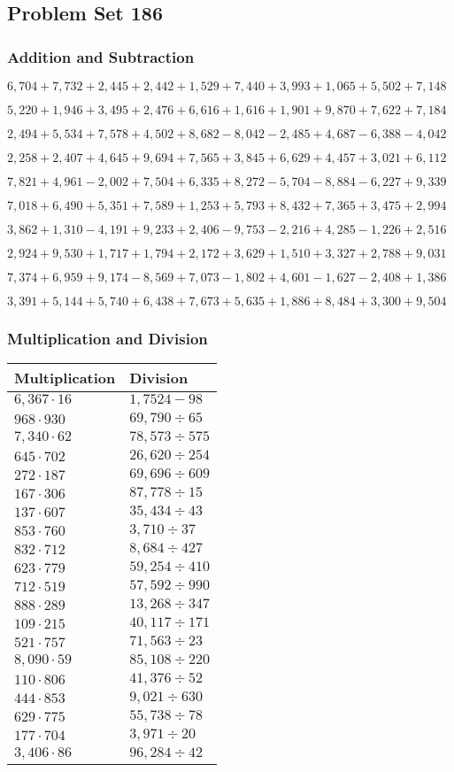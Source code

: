 \hypertarget{problem-set-186}{%
\subsection{Problem Set 186}\label{problem-set-186}}

\hypertarget{addition-and-subtraction}{%
\subsubsection{Addition and
Subtraction}\label{addition-and-subtraction}}

\(6,704+7,732+2,445+2,442+1,529+7,440+3,993+1,065+5,502+7,148\)

\(5,220+1,946+3,495+2,476+6,616+1,616+1,901+9,870+7,622+7,184\)

\(2,494+5,534+7,578+4,502+8,682-8,042-2,485+4,687-6,388-4,042\)

\(2,258+2,407+4,645+9,694+7,565+3,845+6,629+4,457+3,021+6,112\)

\(7,821+4,961-2,002+7,504+6,335+8,272-5,704-8,884-6,227+9,339\)

\(7,018+6,490+5,351+7,589+1,253+5,793+8,432+7,365+3,475+2,994\)

\(3,862+1,310-4,191+9,233+2,406-9,753-2,216+4,285-1,226+2,516\)

\(2,924+9,530+1,717+1,794+2,172+3,629+1,510+3,327+2,788+9,031\)

\(7,374+6,959+9,174-8,569+7,073-1,802+4,601-1,627-2,408+1,386\)

\(3,391+5,144+5,740+6,438+7,673+5,635+1,886+8,484+3,300+9,504\)

\hypertarget{multiplication-and-division}{%
\subsubsection{Multiplication and
Division}\label{multiplication-and-division}}

\begin{longtable}[]{@{}ll@{}}
\toprule
Multiplication & Division\tabularnewline
\midrule
\endhead
\(6,367\cdot16\) & \(1,752 4-98\)\tabularnewline
\(968\cdot930\) & \(69,790÷65\)\tabularnewline
\(7,340\cdot62\) & \(78,573÷575\)\tabularnewline
\(645\cdot702\) & \(26,620÷254\)\tabularnewline
\(272\cdot187\) & \(69,696÷609\)\tabularnewline
\(167\cdot306\) & \(87,778÷15\)\tabularnewline
\(137\cdot607\) & \(35,434÷43\)\tabularnewline
\(853\cdot760\) & \(3,710÷37\)\tabularnewline
\(832\cdot712\) & \(8,684÷427\)\tabularnewline
\(623\cdot779\) & \(59,254÷410\)\tabularnewline
\(712\cdot519\) & \(57,592÷990\)\tabularnewline
\(888\cdot289\) & \(13,268÷347\)\tabularnewline
\(109\cdot215\) & \(40,117÷171\)\tabularnewline
\(521\cdot757\) & \(71,563÷23\)\tabularnewline
\(8,090\cdot59\) & \(85,108÷220\)\tabularnewline
\(110\cdot806\) & \(41,376÷52\)\tabularnewline
\(444\cdot853\) & \(9,021÷630\)\tabularnewline
\(629\cdot775\) & \(55,738÷78\)\tabularnewline
\(177\cdot704\) & \(3,971÷20\)\tabularnewline
\(3,406\cdot86\) & \(96,284÷42\)\tabularnewline
\bottomrule
\end{longtable}
